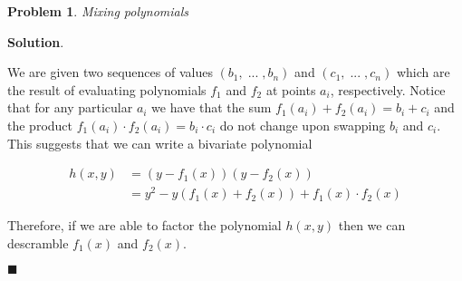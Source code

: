 \documentclass[12pt]{article}
\newtheorem{p}{Problem}[section]
\theoremstyle{definition}
\newenvironment{s}{%
        \begin{trivlist} \item \textbf{Solution}. }{%
            \hspace*{\fill} $\blacksquare$\end{trivlist}}%
\begin{document}
{\begin{p}
Mixing polynomials
\end{p}

\begin{s}

We are given two sequences of values $(b_{1}, \;...\;, b_{n})$ and $(c_{1}, \;...\;, c_{n})$ which are the result of evaluating polynomials $f_{1}$ and $f_{2}$ at points $a_{i}$, respectively. Notice that for any particular $a_{i}$ we have that the sum $f_{1}(a_{i}) + f_{2}(a_{i}) = b_{i} + c_{i}$ and the product $f_{1}(a_{i})\cdot f_{2}(a_{i}) = b_{i}\cdot c_{i}$ do not change upon swapping $b_{i}$ and $c_{i}$. This suggests that we can write a bivariate polynomial

\begin{align*}
h(x,y) &= (y-f_{1}(x))(y-f_{2}(x))\\
&= y^{2} - y(f_{1}(x)+f_{2}(x)) + f_{1}(x)\cdot f_{2}(x)
\end{align*}

Therefore, if we are able to factor the polynomial $h(x,y)$ then we can descramble $f_{1}(x)$ and $f_{2}(x)$.

\end{s}
\end{document}
